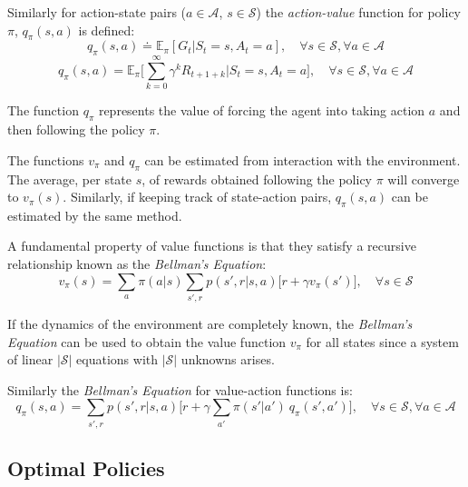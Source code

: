 \documentclass[
  12pt,
  openany]{book}
\begin{document}
Similarly for action-state pairs (\(a \in \mathcal{A}\), \(s \in \mathcal{S}\)) the \emph{action-value} function for policy \(\pi\), \(q_\pi(s,a)\) is defined:
\[ q_\pi(s,a) \doteq \mathds{E}_\pi [ G_t | S_t=s, A_t=a], \quad \forall s \in \mathcal{S}, \forall a \in \mathcal{A}\]
\[ q_\pi(s,a) = \mathds{E}_\pi \bigg[ \sum_{k=0}^{\infty} \gamma^k R_{t+1+k} \bigg| S_t = s, A_t = a \bigg], \quad \forall s \in \mathcal{S}, \forall a \in \mathcal{A}\]

The function \(q_\pi\) represents the value of forcing the agent into taking action \(a\) and then following the policy \(\pi\).

The functions \(v_\pi\) and \(q_\pi\) can be estimated from interaction with the environment. The average, per state \(s\), of rewards obtained following the policy \(\pi\) will converge to \(v_\pi(s)\). Similarly, if keeping track of state-action pairs, \(q_\pi(s,a)\) can be estimated by the same method.

A fundamental property of value functions is that they satisfy a recursive relationship known as the \emph{Bellman's Equation}:
\[v_\pi(s) = \sum_{a} \pi(a|s) \sum_{s',r} p(s',r|s,a) \big[ r + \gamma v_\pi(s') \big], \quad \forall s \in \mathcal{S} \]

If the dynamics of the environment are completely known, the \emph{Bellman's Equation} can be used to obtain the value function \(v_\pi\) for all states since a system of linear \(|\mathcal{S}|\) equations with \(|\mathcal{S}|\) unknowns arises.

Similarly the \emph{Bellman's Equation} for value-action functions is:
\[q_\pi(s,a) = \sum_{s',r} p(s',r|s,a) \big[ r + \gamma \sum_{a'} \pi(s'|a')\ q_\pi(s',a') \big], \quad \forall s \in \mathcal{S}, \forall a \in \mathcal{A} \]

\hypertarget{optimal-policies}{%
\subsection{Optimal Policies}\label{optimal-policies}}
\end{document}

